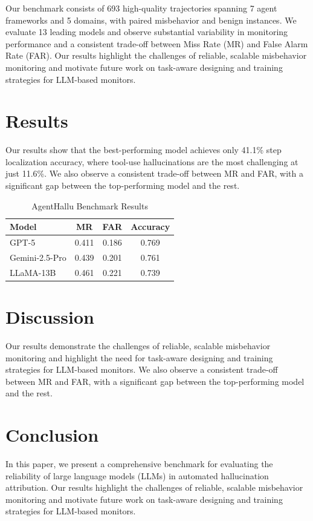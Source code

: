 \documentclass{article}
\begin{document}
Our benchmark consists of 693 high-quality trajectories spanning 7 agent frameworks and 5 domains, with paired misbehavior and benign instances. We evaluate 13 leading models and observe substantial variability in monitoring performance and a consistent trade-off between Miss Rate (MR) and False Alarm Rate (FAR). Our results highlight the challenges of reliable, scalable misbehavior monitoring and motivate future work on task-aware designing and training strategies for LLM-based monitors.

\section{Results}

Our results show that the best-performing model achieves only 41.1\% step localization accuracy, where tool-use hallucinations are the most challenging at just 11.6\%. We also observe a consistent trade-off between MR and FAR, with a significant gap between the top-performing model and the rest.

\begin{table}[h!]
\centering
\begin{tabular}{|l|c|c|c|}
\hline
Model & MR & FAR & Accuracy \\
\hline
GPT-5 & 0.411 & 0.186 & 0.769 \\
Gemini-2.5-Pro & 0.439 & 0.201 & 0.761 \\
LLaMA-13B & 0.461 & 0.221 & 0.739 \\
\hline
\end{tabular}
\caption{AgentHallu Benchmark Results}
\end{table}

\section{Discussion}

Our results demonstrate the challenges of reliable, scalable misbehavior monitoring and highlight the need for task-aware designing and training strategies for LLM-based monitors. We also observe a consistent trade-off between MR and FAR, with a significant gap between the top-performing model and the rest.

\section{Conclusion}

In this paper, we present a comprehensive benchmark for evaluating the reliability of large language models (LLMs) in automated hallucination attribution. Our results highlight the challenges of reliable, scalable misbehavior monitoring and motivate future work on task-aware designing and training strategies for LLM-based monitors.
\end{document}
